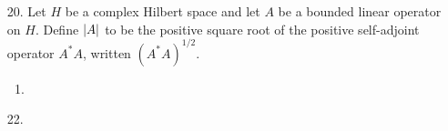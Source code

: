 \documentclass[11pt,leqno]{article}
\theoremstyle{plain}
\theoremstyle{definition}
\numberwithin{equation}{section}
\numberwithin{lem}{section}
\begin{document}
\begin{enumerate}
    \item[20.] Let $H$ be a complex Hilbert space and let $A$ be a bounded linear operator on $H$. Define $\abs{A}$ to be the positive square root of the positive self-adjoint operator $A^\ast A$, written $(A^\ast A)^{1/2}$.
    \begin{enumerate}
        \item 
    \end{enumerate}
    \item[22.] 
\end{enumerate}
\end{document}
